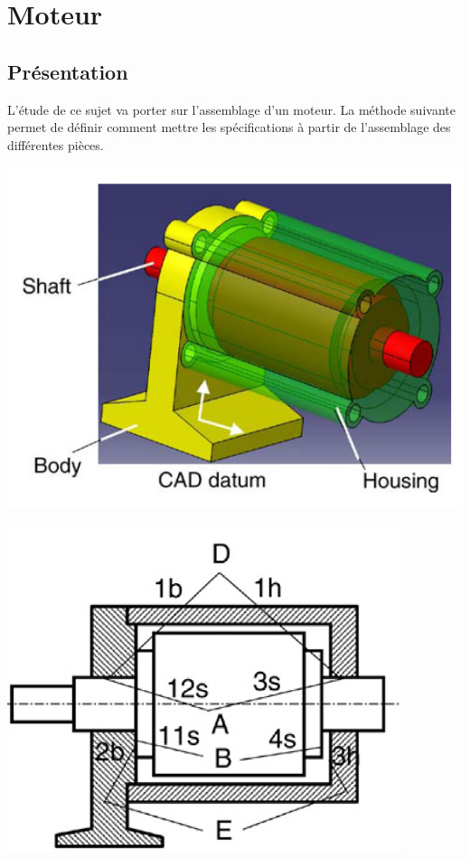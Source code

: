 \newpage

\section{Moteur}

\subsection{Présentation}

L'étude de ce sujet va porter sur l'assemblage d'un moteur. La méthode suivante permet de définir comment mettre les spécifications à partir de l'assemblage des différentes pièces.


\begin{minipage}{0.48\linewidth}
 \includegraphics[width=0.9\linewidth]{img/Moteur1.png}
\end{minipage}
\hfill
\begin{minipage}{0.48\linewidth}
 \includegraphics[width=0.9\linewidth]{img/Moteur2.png}
\end{minipage}

